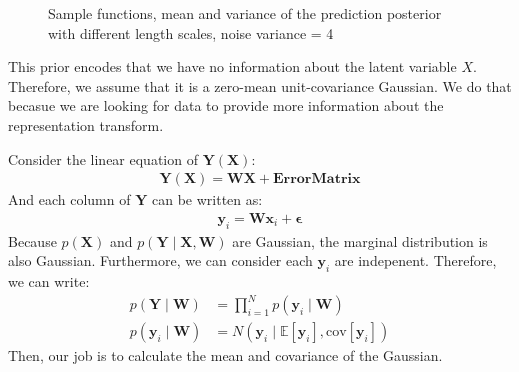 \documentclass[12pt]{article}
\newenvironment{question}[2][Question]{\begin{trivlist}
\kern10pt
\item[\hskip \labelsep {\bfseries #1}\hskip \labelsep {\bfseries #2.}]}{\end{trivlist}}
\begin{document}
\begin{question}{11}
\begin{figure}[h!]
{  }
  \caption{Sample functions, mean and variance of the prediction posterior with 
           different length scales, noise variance = 4}
  \label{fig:Q11-predict-post-noise4}
\end{figure}


\end{question}

\begin{question}{12}
This prior encodes that we have no information about the latent variable $X$. 
Therefore, we assume that it is a zero-mean unit-covariance Gaussian. We do that becasue
we are looking for data to provide more information about the representation transform.
\end{question}

\begin{question}{13}
Consider the linear equation of $\mathbf{Y}(\mathbf{X})$:
  \begin{align*}
    \mathbf{Y}(\mathbf{X}) = \mathbf{W}\mathbf{X} + \bm{ErrorMatrix}
  \end{align*}
And each column of $\mathbf{Y}$ can be written as:
\begin{align*}
  \mathbf{y}_i = \mathbf{W}\mathbf{x}_i + \bm{\epsilon}
\end{align*}
Because $p(\mathbf{X})$ and $p(\mathbf{Y}\mid\mathbf{X}, \mathbf{W})$ are Gaussian, 
 the marginal distribution is also Gaussian.
 Furthermore, we can consider each $\mathbf{y}_i$ are indepenent. Therefore, 
 we can write:
\begin{align*}
  p(\mathbf{Y}\mid\mathbf{W}) &= \prod_{i=1}^{N} p(\mathbf{y}_i\mid\mathbf{W}) \\
  p(\mathbf{y}_i\mid\mathbf{W}) &= N(\mathbf{y}_i\mid \mathbb{E}[\mathbf{y}_i], \text{cov}[\mathbf{y}_i])
\end{align*}
Then, our job is to calculate the mean and covariance of the Gaussian.


\end{question}
\end{document}
